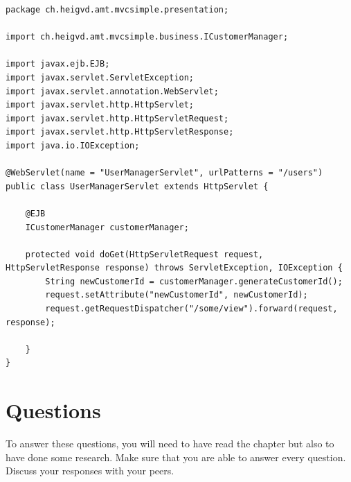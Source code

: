\vspace{10pt}
\begin{minipage}{\linewidth}
\begin{lstlisting}[frame=single]
package ch.heigvd.amt.mvcsimple.presentation;

import ch.heigvd.amt.mvcsimple.business.ICustomerManager;

import javax.ejb.EJB;
import javax.servlet.ServletException;
import javax.servlet.annotation.WebServlet;
import javax.servlet.http.HttpServlet;
import javax.servlet.http.HttpServletRequest;
import javax.servlet.http.HttpServletResponse;
import java.io.IOException;

@WebServlet(name = "UserManagerServlet", urlPatterns = "/users")
public class UserManagerServlet extends HttpServlet {
    
    @EJB
    ICustomerManager customerManager;

    protected void doGet(HttpServletRequest request, HttpServletResponse response) throws ServletException, IOException {
        String newCustomerId = customerManager.generateCustomerId();
        request.setAttribute("newCustomerId", newCustomerId);
        request.getRequestDispatcher("/some/view").forward(request, response);

    }
}\end{lstlisting}
\end{minipage}



\section{Questions}

To answer these questions, you will need to have read the chapter but also to have done some research. Make sure that you are able to answer every question. Discuss your responses with your peers.


